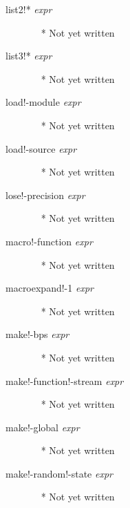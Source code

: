 \documentclass[a4paper,11pt]{article}
\begin{document}
\begin{description}
\item [{\ttfamily list2!*} {\itshape  expr}]  ~\newline
  * Not yet written

\item [{\ttfamily list3!*} {\itshape  expr}]  ~\newline
  * Not yet written

\item [{\ttfamily load!-module} {\itshape  expr}]  ~\newline
  * Not yet written

\item [{\ttfamily load!-source} {\itshape  expr}]  ~\newline
  * Not yet written

\item [{\ttfamily lose!-precision} {\itshape  expr}]  ~\newline
  * Not yet written

\item [{\ttfamily macro!-function} {\itshape  expr}]  ~\newline
  * Not yet written

\item [{\ttfamily macroexpand!-1} {\itshape  expr}]  ~\newline
  * Not yet written

\item [{\ttfamily make!-bps} {\itshape  expr}]  ~\newline
  * Not yet written

\item [{\ttfamily make!-function!-stream} {\itshape  expr}]  ~\newline
  * Not yet written

\item [{\ttfamily make!-global} {\itshape  expr}]  ~\newline
  * Not yet written

\item [{\ttfamily make!-random!-state} {\itshape  expr}]  ~\newline
  * Not yet written


\end{description}
\end{document}
